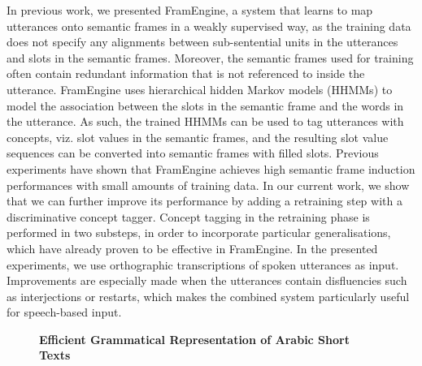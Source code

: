 \documentclass[10pt, a4paper, twopage, headinclude, footinclude, BCOR5mm]{scrartcl}
\begin{document}
\noindent
In previous work, we presented FramEngine, a system that learns to map utterances onto semantic frames in a weakly supervised way, as the training data does not specify any alignments between sub-sentential units in the utterances and slots in the semantic frames. Moreover, the semantic frames used for training often contain redundant information that is not referenced to inside the utterance. FramEngine uses hierarchical hidden Markov models (HHMMs) to model the association between the slots in the semantic frame and the words in the utterance. As such, the trained HHMMs can be used to tag utterances with concepts, viz. slot values in the semantic frames, and the resulting slot value sequences can be converted into semantic frames with filled slots.  Previous experiments have shown that FramEngine achieves high semantic frame induction performances with small amounts of training data. In our current work, we show that we can further improve its performance by adding a retraining step with a discriminative concept tagger. Concept tagging in the retraining phase is performed in two substeps, in order to incorporate particular generalisations, which have already proven to be effective in FramEngine. In the presented experiments, we use orthographic transcriptions of spoken utterances as input. Improvements are especially made when the utterances contain disfluencies such as interjections or restarts, which makes the combined system particularly useful for speech-based input. 


\newpage

\begin{figure}[t!]
\centering
\large\textbf{Efficient Grammatical Representation of Arabic Short Texts}
\vspace*{0.5cm}
\end{figure}


        \begin{table}[t!]
    \end{table}
\end{document}
